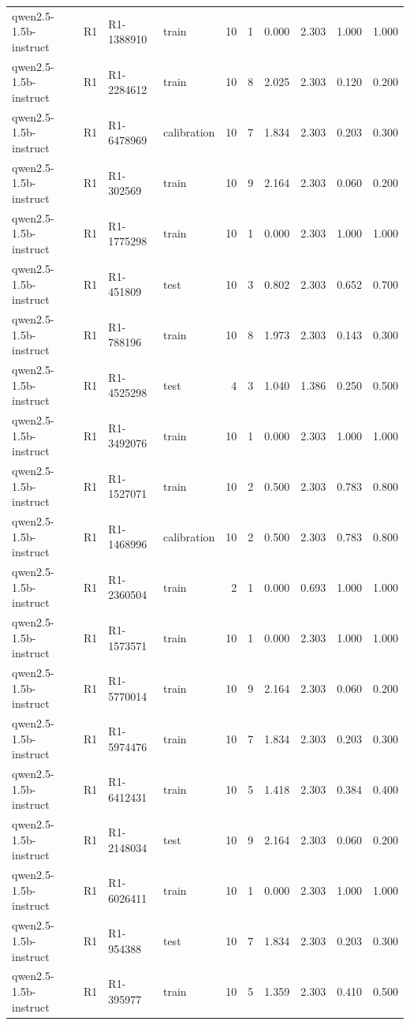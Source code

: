 \begin{table}
\begin{tabular}{llllrrrrrr}
qwen2.5-1.5b-instruct & R1 & R1-1388910 & train & 10 & 1 & 0.000 & 2.303 & 1.000 & 1.000 \\
qwen2.5-1.5b-instruct & R1 & R1-2284612 & train & 10 & 8 & 2.025 & 2.303 & 0.120 & 0.200 \\
qwen2.5-1.5b-instruct & R1 & R1-6478969 & calibration & 10 & 7 & 1.834 & 2.303 & 0.203 & 0.300 \\
qwen2.5-1.5b-instruct & R1 & R1-302569 & train & 10 & 9 & 2.164 & 2.303 & 0.060 & 0.200 \\
qwen2.5-1.5b-instruct & R1 & R1-1775298 & train & 10 & 1 & 0.000 & 2.303 & 1.000 & 1.000 \\
qwen2.5-1.5b-instruct & R1 & R1-451809 & test & 10 & 3 & 0.802 & 2.303 & 0.652 & 0.700 \\
qwen2.5-1.5b-instruct & R1 & R1-788196 & train & 10 & 8 & 1.973 & 2.303 & 0.143 & 0.300 \\
qwen2.5-1.5b-instruct & R1 & R1-4525298 & test & 4 & 3 & 1.040 & 1.386 & 0.250 & 0.500 \\
qwen2.5-1.5b-instruct & R1 & R1-3492076 & train & 10 & 1 & 0.000 & 2.303 & 1.000 & 1.000 \\
qwen2.5-1.5b-instruct & R1 & R1-1527071 & train & 10 & 2 & 0.500 & 2.303 & 0.783 & 0.800 \\
qwen2.5-1.5b-instruct & R1 & R1-1468996 & calibration & 10 & 2 & 0.500 & 2.303 & 0.783 & 0.800 \\
qwen2.5-1.5b-instruct & R1 & R1-2360504 & train & 2 & 1 & 0.000 & 0.693 & 1.000 & 1.000 \\
qwen2.5-1.5b-instruct & R1 & R1-1573571 & train & 10 & 1 & 0.000 & 2.303 & 1.000 & 1.000 \\
qwen2.5-1.5b-instruct & R1 & R1-5770014 & train & 10 & 9 & 2.164 & 2.303 & 0.060 & 0.200 \\
qwen2.5-1.5b-instruct & R1 & R1-5974476 & train & 10 & 7 & 1.834 & 2.303 & 0.203 & 0.300 \\
qwen2.5-1.5b-instruct & R1 & R1-6412431 & train & 10 & 5 & 1.418 & 2.303 & 0.384 & 0.400 \\
qwen2.5-1.5b-instruct & R1 & R1-2148034 & test & 10 & 9 & 2.164 & 2.303 & 0.060 & 0.200 \\
qwen2.5-1.5b-instruct & R1 & R1-6026411 & train & 10 & 1 & 0.000 & 2.303 & 1.000 & 1.000 \\
qwen2.5-1.5b-instruct & R1 & R1-954388 & test & 10 & 7 & 1.834 & 2.303 & 0.203 & 0.300 \\
qwen2.5-1.5b-instruct & R1 & R1-395977 & train & 10 & 5 & 1.359 & 2.303 & 0.410 & 0.500 \\

\end{tabular}
\end{table}
